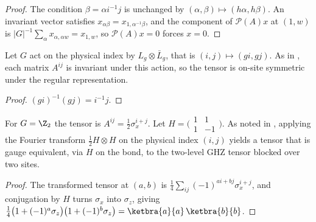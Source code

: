\begin{proof}\leanok
    The condition $\beta=\alpha i^{-1}j$ is unchanged by
    $(\alpha,\beta)\mapsto(h\alpha,h\beta)$. An invariant vector satisfies
    $x_{\alpha\beta}=x_{1,\alpha^{-1}\beta}$, and the component of
    $\mathcal P(A)x$ at $(1,w)$ is $|G|^{-1}\sum_\alpha x_{\alpha,\alpha w}
        =x_{1,w}$, so $\mathcal P(A)x=0$ forces $x=0$.
\end{proof}

\begin{lemma}%
    \label{thm:ghz_g_injective_symmetric}
    \leanok
    Let $G$ act on the physical index by $L_g\otimes\bar L_g$, that is
    $(i,j)\mapsto(gi,gj)$. As in
    \cite[Section~III.A, ``Virtual symmetries'']{Cirac2021Matrix}, each matrix
    $A^{ij}$ is invariant under this action, so the tensor is on-site symmetric
    under the regular representation.
\end{lemma}

\begin{proof}\leanok
    $(gi)^{-1}(gj)=i^{-1}j$.
\end{proof}

\begin{lemma}[The case $G=\Z_2$ is the GHZ tensor]\label{thm:ghz_g_injective_z2}
    \leanok
    For $G=\Z_2$ the tensor is $A^{ij}=\tfrac12\sigma_x^{i+j}$. Let
    $H=\bigl(\begin{smallmatrix}1&1\\1&-1\end{smallmatrix}\bigr)$. As noted in
    \cite[Section~III.A, ``Virtual symmetries'']{Cirac2021Matrix}, applying the
    Fourier transform $\tfrac12 H\otimes H$ on the physical index $(i,j)$
    yields a tensor that is gauge equivalent, via $H$ on the bond, to the
    two-level GHZ tensor blocked over two sites.
\end{lemma}

\begin{proof}\leanok
    The transformed tensor at $(a,b)$ is
    $\tfrac14\sum_{ij}(-1)^{ai+bj}\sigma_x^{i+j}$, and conjugation by $H$ turns
    $\sigma_x$ into $\sigma_z$, giving
    $\tfrac14\bigl(1+(-1)^a\sigma_z\bigr)\bigl(1+(-1)^b\sigma_z\bigr)
        =\ketbra{a}{a}\,\ketbra{b}{b}$.
\end{proof}

